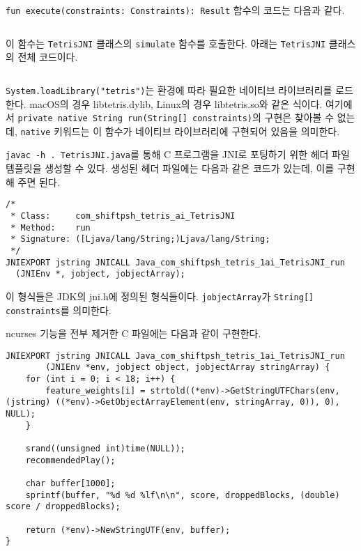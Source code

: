 \texttt{fun execute(constraints: Constraints): Result} 함수의 코드는 다음과 같다.

\inputminted[xleftmargin=\parindent,linenos,firstline=9,lastline=16,breaklines]{kotlin}{inc-sources-java/main.kt}

이 함수는 \texttt{TetrisJNI} 클래스의 \texttt{simulate} 함수를 호출한다. 아래는 \texttt{TetrisJNI} 클래스의 전체 코드이다.

\inputminted[xleftmargin=\parindent,linenos,breaklines]{java}{inc-sources-java/TetrisJNI.java}

\texttt{System.loadLibrary("tetris")}는 환경에 따라 필요한 네이티브 라이브러리를 로드한다. macOS의 경우 libtetris.dylib, 
Linux의 경우 libtetris.so와 같은 식이다. 여기에서 \texttt{private native String run(String[] constraints)}의 구현은
찾아볼 수 없는데, \texttt{native} 키워드는 이 함수가 네이티브 라이브러리에 구현되어 있음을 의미한다.

\texttt{javac -h . TetrisJNI.java}를 통해 C 프로그램을 JNI로 포팅하기 위한 헤더 파일 템플릿을 생성할 수 있다.\cite{JNI}
생성된 헤더 파일에는 다음과 같은 코드가 있는데, 이를 구현해 주면 된다.

\begin{verbatim}
/*
 * Class:     com_shiftpsh_tetris_ai_TetrisJNI
 * Method:    run
 * Signature: ([Ljava/lang/String;)Ljava/lang/String;
 */
JNIEXPORT jstring JNICALL Java_com_shiftpsh_tetris_1ai_TetrisJNI_run
  (JNIEnv *, jobject, jobjectArray);
\end{verbatim}

이 형식들은 JDK의 jni.h에 정의된 형식들이다. \texttt{jobjectArray}가 \texttt{String[] constraints}를 의미한다.

ncurses 기능을 전부 제거한 C 파일에는 다음과 같이 구현한다.

\begin{verbatim}
JNIEXPORT jstring JNICALL Java_com_shiftpsh_tetris_1ai_TetrisJNI_run
        (JNIEnv *env, jobject object, jobjectArray stringArray) {
    for (int i = 0; i < 18; i++) {
        feature_weights[i] = strtold((*env)->GetStringUTFChars(env, (jstring) ((*env)->GetObjectArrayElement(env, stringArray, 0)), 0), NULL);
    }

    srand((unsigned int)time(NULL));
    recommendedPlay();

    char buffer[1000];
    sprintf(buffer, "%d %d %lf\n\n", score, droppedBlocks, (double) score / droppedBlocks);

    return (*env)->NewStringUTF(env, buffer);
}
\end{verbatim}

